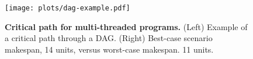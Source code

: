 \begin{figure}[t]
\centering
\texttt{[image: plots/dag-example.pdf]}
\vspace{-2mm}
\caption{\small \textbf{Critical path for multi-threaded programs.} (Left) Example of a critical path through a DAG. (Right) Best-case scenario makespan, 14 units, versus worst-case makespan. 11 units.}
\label{fig:dag_scheduling}
\vspace{-5mm}
\end{figure}